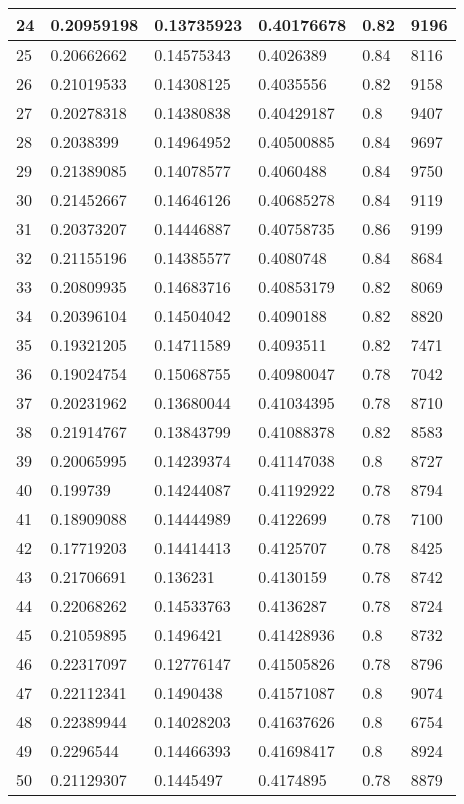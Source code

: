 \begin{longtable}{|l|l|l|l|l|l|}
24 & 0.20959198 & 0.13735923 & 0.40176678 & 0.82 & 9196 \\ \hline 
25 & 0.20662662 & 0.14575343 & 0.4026389 & 0.84 & 8116 \\ \hline 
26 & 0.21019533 & 0.14308125 & 0.4035556 & 0.82 & 9158 \\ \hline 
27 & 0.20278318 & 0.14380838 & 0.40429187 & 0.8 & 9407 \\ \hline 
28 & 0.2038399 & 0.14964952 & 0.40500885 & 0.84 & 9697 \\ \hline 
29 & 0.21389085 & 0.14078577 & 0.4060488 & 0.84 & 9750 \\ \hline 
30 & 0.21452667 & 0.14646126 & 0.40685278 & 0.84 & 9119 \\ \hline 
31 & 0.20373207 & 0.14446887 & 0.40758735 & 0.86 & 9199 \\ \hline 
32 & 0.21155196 & 0.14385577 & 0.4080748 & 0.84 & 8684 \\ \hline 
33 & 0.20809935 & 0.14683716 & 0.40853179 & 0.82 & 8069 \\ \hline 
34 & 0.20396104 & 0.14504042 & 0.4090188 & 0.82 & 8820 \\ \hline 
35 & 0.19321205 & 0.14711589 & 0.4093511 & 0.82 & 7471 \\ \hline 
36 & 0.19024754 & 0.15068755 & 0.40980047 & 0.78 & 7042 \\ \hline 
37 & 0.20231962 & 0.13680044 & 0.41034395 & 0.78 & 8710 \\ \hline 
38 & 0.21914767 & 0.13843799 & 0.41088378 & 0.82 & 8583 \\ \hline 
39 & 0.20065995 & 0.14239374 & 0.41147038 & 0.8 & 8727 \\ \hline 
40 & 0.199739 & 0.14244087 & 0.41192922 & 0.78 & 8794 \\ \hline 
41 & 0.18909088 & 0.14444989 & 0.4122699 & 0.78 & 7100 \\ \hline 
42 & 0.17719203 & 0.14414413 & 0.4125707 & 0.78 & 8425 \\ \hline 
43 & 0.21706691 & 0.136231 & 0.4130159 & 0.78 & 8742 \\ \hline 
44 & 0.22068262 & 0.14533763 & 0.4136287 & 0.78 & 8724 \\ \hline 
45 & 0.21059895 & 0.1496421 & 0.41428936 & 0.8 & 8732 \\ \hline 
46 & 0.22317097 & 0.12776147 & 0.41505826 & 0.78 & 8796 \\ \hline 
47 & 0.22112341 & 0.1490438 & 0.41571087 & 0.8 & 9074 \\ \hline 
48 & 0.22389944 & 0.14028203 & 0.41637626 & 0.8 & 6754 \\ \hline 
49 & 0.2296544 & 0.14466393 & 0.41698417 & 0.8 & 8924 \\ \hline 
50 & 0.21129307 & 0.1445497 & 0.4174895 & 0.78 & 8879 \\ \hline 
\end{longtable}